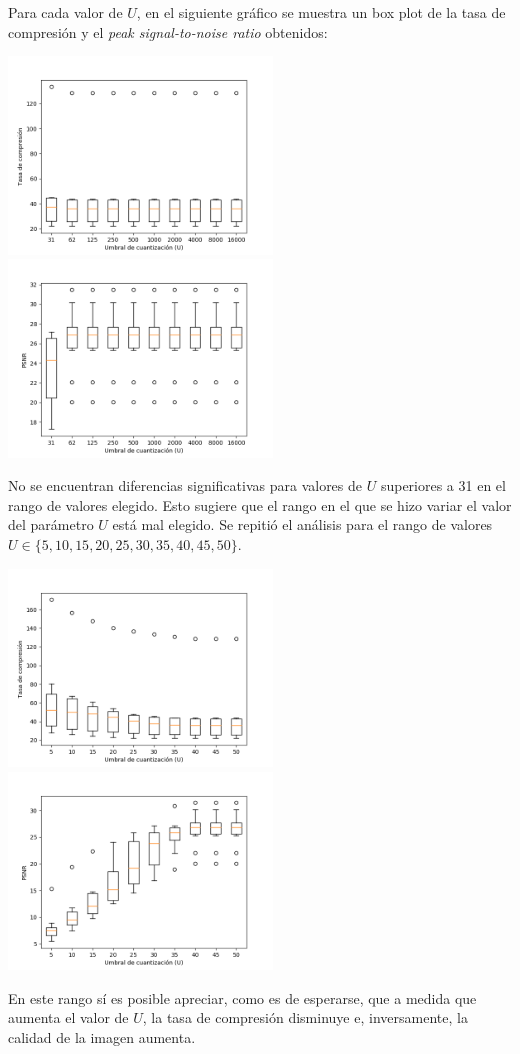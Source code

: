 \documentclass{article}
\newcommand{\set}[1]{\{#1\}}
\begin{document}
Para cada valor de $U$, en el siguiente gráfico se muestra un
box plot de la tasa de compresión y el
{\em peak signal-to-noise ratio} obtenidos:\\
\begin{center}
\includegraphics[width=7cm]{../imgs/output/gray_plots/u_rate.png}
\includegraphics[width=7cm]{../imgs/output/gray_plots/u_psnr.png}
\end{center}

No se encuentran diferencias significativas para valores de $U$
superiores a 31 en el rango de valores elegido.
Esto sugiere que el rango en el que se hizo variar el valor del parámetro $U$
está mal elegido.
Se repitió el análisis para el rango de valores
$U \in \set{5, 10, 15, 20, 25, 30, 35, 40, 45, 50}$.
\begin{center}
\includegraphics[width=7cm]{../imgs/output/gray_plots/ualt_rate.png}
\includegraphics[width=7cm]{../imgs/output/gray_plots/ualt_psnr.png}
\end{center}
En este rango sí es posible apreciar, como es de esperarse, que
a medida que aumenta el valor de $U$,
la tasa de compresión disminuye e, inversamente, la calidad de
la imagen aumenta.
\end{document}
